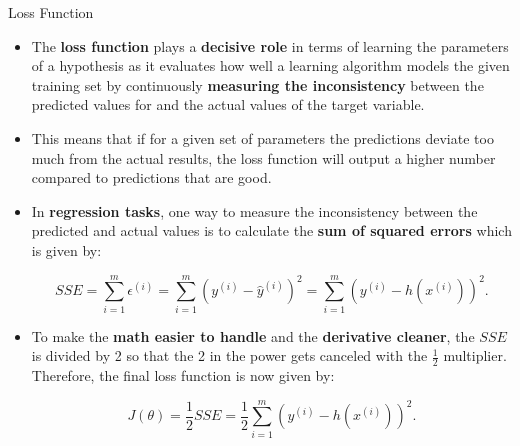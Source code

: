 \documentclass[document.tex]{subfiles}
\begin{document}
    \begin{frame}{Loss Function}
        \begin{itemize}
            \item The \textbf{loss function} plays a \textbf{decisive role} in terms of learning the parameters of a hypothesis as it evaluates how well a learning algorithm models the given training set by continuously \textbf{measuring the inconsistency} between the predicted values for and the actual values of the target variable.
            \item This means that if for a given set of parameters the predictions deviate too much from the actual results, the loss function will output a higher number compared to predictions that are good.
            \item In \textbf{regression tasks}, one way to measure the inconsistency between the predicted and actual values is to calculate the \textbf{sum of squared errors} which is given by:
            
            $$SSE = \sum_{i=1}^m \epsilon^{(i)} = \sum_{i=1}^m (y^{(i)} - \hat y^{(i)})^2 = \sum_{i=1}^m (y^{(i)} - h(x^{(i)}))^2.$$
            
            \item To make the \textbf{math easier to handle} and the \textbf{derivative cleaner}, the $SSE$ is divided by 2 so that the 2 in the power gets canceled with the $\frac{1}{2}$ multiplier. Therefore, the final loss function is now given by:
            
            $$J(\theta) = \frac{1}{2} SSE = \frac{1}{2} \sum_{i=1}^m (y^{(i)} - h(x^{(i)}))^2.$$
        \end{itemize}
    \end{frame}
\end{document}
